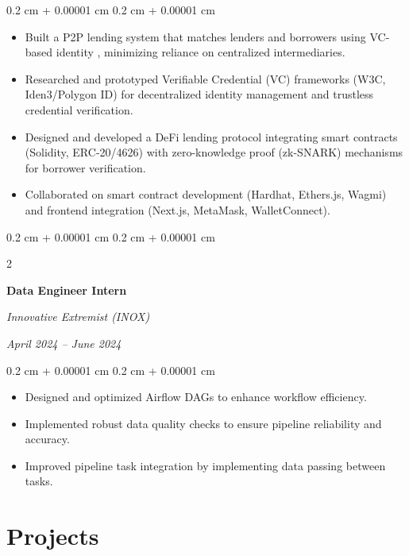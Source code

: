 \documentclass[10pt,letterpaper]{extarticle}
\newenvironment{highlights}{
    \begin{itemize}[
        topsep=0.10 cm,
        parsep=0.10 cm,
        partopsep=0pt,
        itemsep=0pt,
        leftmargin=0.4 cm + 10pt
    ]
}{
    \end{itemize}
} %
\newenvironment{onecolentry}{
    \begin{adjustwidth}{
        0.2 cm + 0.00001 cm
    }{
        0.2 cm + 0.00001 cm
    }
}{
    \end{adjustwidth}
} %
\newenvironment{twocolentry}[2][]{
    \onecolentry
    \def\secondColumn{#2}
    \setcolumnwidth{\fill, 5.0 cm}
    \begin{paracol}{2}
}{
    \switchcolumn \raggedleft \secondColumn
    \end{paracol}
    \endonecolentry
} %
\begin{document}
        \vspace{0.10 cm}
        \begin{onecolentry}
            \begin{highlights}
                \item Built a P2P lending system that matches lenders and borrowers using VC-based identity , minimizing reliance on centralized intermediaries.
                \item Researched and prototyped Verifiable Credential (VC) frameworks (W3C, Iden3/Polygon ID) for decentralized identity management and trustless credential verification.
                \item Designed and developed a DeFi lending protocol integrating smart contracts (Solidity, ERC-20/4626) with zero-knowledge proof (zk-SNARK) mechanisms for borrower verification.
                \item Collaborated on smart contract development (Hardhat, Ethers.js, Wagmi) and frontend integration (Next.js, MetaMask, WalletConnect).
            \end{highlights}
        \end{onecolentry}

        \begin{twocolentry}{
            \textit{April 2024 – June 2024}}
            \textbf{Data Engineer Intern}

            \textit{Innovative Extremist (INOX)}
        \end{twocolentry}

        \vspace{0.10 cm}
        \begin{onecolentry}
            \begin{highlights}
                \item Designed and optimized Airflow DAGs to enhance workflow efficiency.
                \item Implemented robust data quality checks to ensure pipeline reliability and accuracy.
                \item Improved pipeline task integration by implementing data passing between tasks.
            \end{highlights}
        \end{onecolentry}
    
        \section{Projects}
\end{document}

